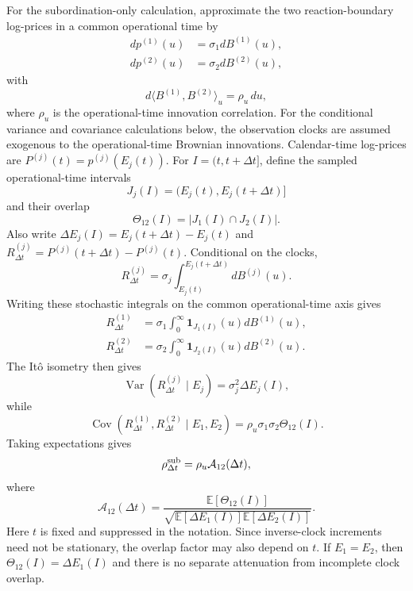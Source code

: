\documentclass[5p,final]{elsarticle}
\begin{document}
For the subordination-only calculation, approximate the two reaction-boundary log-prices in a common operational time by
\begin{align}
    dp^{(1)}(u) &= \sigma_1dB^{(1)}(u),\\
    dp^{(2)}(u) &= \sigma_2dB^{(2)}(u),
\end{align}
with
\begin{equation}
    d\langle B^{(1)},B^{(2)}\rangle_u=\rho_u\,du,
\end{equation}
where $\rho_u$ is the operational-time innovation correlation. For the conditional variance and covariance calculations below, the observation clocks are assumed exogenous to the operational-time Brownian innovations. Calendar-time log-prices are $P^{(j)}(t)=p^{(j)}(E_j(t))$. For $I=(t,t+\Delta t]$, define the sampled operational-time intervals
\begin{equation}
    J_j(I)=\big(E_j(t),E_j(t+\Delta t)\big]
\end{equation}
and their overlap
\begin{equation}
    \Theta_{12}(I)=\left|J_1(I)\cap J_2(I)\right|.
\end{equation}
Also write $\Delta E_j(I)=E_j(t+\Delta t)-E_j(t)$ and $R_{\Delta t}^{(j)}=P^{(j)}(t+\Delta t)-P^{(j)}(t)$. Conditional on the clocks,
\begin{equation}
    R_{\Delta t}^{(j)}
    =\sigma_j\int_{E_j(t)}^{E_j(t+\Delta t)}dB^{(j)}(u).
\end{equation}
Writing these stochastic integrals on the common operational-time axis gives
\begin{align}
    R_{\Delta t}^{(1)}
    &=\sigma_1\int_0^\infty
    \mathbf 1_{J_1(I)}(u)dB^{(1)}(u),\\
    R_{\Delta t}^{(2)}
    &=\sigma_2\int_0^\infty
    \mathbf 1_{J_2(I)}(u)dB^{(2)}(u).
\end{align}
The It\^{o} isometry then gives
\begin{equation}
    \operatorname{Var}(R_{\Delta t}^{(j)}\mid E_j)=\sigma_j^2\Delta E_j(I),
\end{equation}
while
\begin{equation}
    \operatorname{Cov}(R_{\Delta t}^{(1)},R_{\Delta t}^{(2)}\mid E_1,E_2)
    =\rho_u\sigma_1\sigma_2\Theta_{12}(I).
\end{equation}
Taking expectations gives
\begin{equation}
    \rho_{\Delta t}^{\rm sub}=\rho_u\mathcal A_{12}(\Delta t),
\end{equation}
where
\begin{equation}
    \mathcal A_{12}(\Delta t)
    =\frac{\mathbb E[\Theta_{12}(I)]}
    {\sqrt{\mathbb E[\Delta E_1(I)]\mathbb E[\Delta E_2(I)]}}.
\end{equation}
Here $t$ is fixed and suppressed in the notation. Since inverse-clock increments need not be stationary, the overlap factor may also depend on $t$.
If $E_1=E_2$, then $\Theta_{12}(I)=\Delta E_1(I)$ and there is no separate attenuation from incomplete clock overlap.
\end{document}
